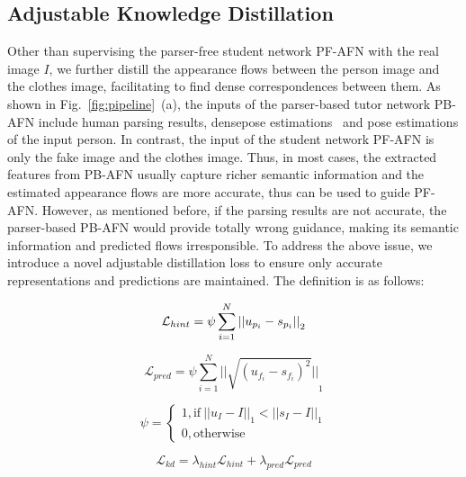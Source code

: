 \documentclass[final]{cvpr}
\begin{document}
	\subsection{Adjustable Knowledge Distillation} \label{sec:kd}
Other than supervising the parser-free student network PF-AFN with the real image $I$, we further distill the appearance flows between the person image and the clothes image, facilitating to find dense correspondences between them.
As shown in Fig.~\ref{fig:pipeline}~(a), the inputs of the parser-based tutor network PB-AFN include human parsing results, densepose estimations~\cite{densepose} and pose estimations of the input person. 
In contrast, the input of the student network PF-AFN is only the fake image and the clothes image. 
Thus, in most cases, the extracted features from PB-AFN usually capture richer semantic information and the estimated appearance flows are more accurate, thus can be used to guide PF-AFN.
However, as mentioned before, if the parsing results are not accurate, the parser-based PB-AFN would provide totally wrong guidance, making its semantic information and predicted flows irresponsible.
To address the above issue, we introduce a novel adjustable distillation loss to ensure only accurate representations and predictions are maintained. The definition is as follows:
\begin{small}
		\begin{equation}
			\setlength\abovedisplayskip{3pt}\setlength\belowdisplayskip{3pt}
			\mathcal{L}_{hint} = {\psi}\sum_{i=1}^N{||{u}_{p_i}-{s}_{p_i}||}_2
		\end{equation}
	\end{small}
	\begin{small}
		\begin{equation}	
			\mathcal{L}_{pred} = {\psi}\sum_{i=1}^N{||\sqrt{({u}_{f_i}-{s}_{f_i})^2}||}_1
		\end{equation}
	\end{small}
	\begin{small}
		\begin{equation}	
			{\psi}=
			\begin{cases}
				1, \text{if} \ {||{u}_I-I||}_1<{||{s}_I-I||}_1\\
				0,\text{otherwise}
			\end{cases}
		\end{equation}
	\end{small}
	\begin{small}
		\begin{equation}
			\mathcal{L}_{kd} = {\lambda}_{hint}\mathcal{L}_{hint} + {\lambda}_{pred}\mathcal{L}_{pred}
		\end{equation}
	\end{small}
\end{document}

